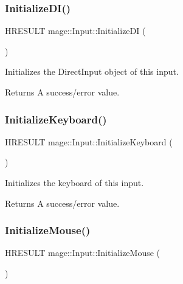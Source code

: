 \subsubsection{\texorpdfstring{Initialize\+D\+I()}{InitializeDI()}}
{\footnotesize\ttfamily H\+R\+E\+S\+U\+LT mage\+::\+Input\+::\+Initialize\+DI (\begin{DoxyParamCaption}{ }\end{DoxyParamCaption})\hspace{0.3cm}{\ttfamily [protected]}}

Initializes the Direct\+Input object of this input.

\begin{DoxyReturn}{Returns}
A success/error value. 
\end{DoxyReturn}
\hypertarget{classmage_1_1_input_ab7e61b7a81ce17aa2f959a18387922a6}{}\label{classmage_1_1_input_ab7e61b7a81ce17aa2f959a18387922a6} 
\subsubsection{\texorpdfstring{Initialize\+Keyboard()}{InitializeKeyboard()}}
{\footnotesize\ttfamily H\+R\+E\+S\+U\+LT mage\+::\+Input\+::\+Initialize\+Keyboard (\begin{DoxyParamCaption}{ }\end{DoxyParamCaption})\hspace{0.3cm}{\ttfamily [protected]}}

Initializes the keyboard of this input.

\begin{DoxyReturn}{Returns}
A success/error value. 
\end{DoxyReturn}
\hypertarget{classmage_1_1_input_a134b0a317bb6709b03995e04c2e3d3f1}{}\label{classmage_1_1_input_a134b0a317bb6709b03995e04c2e3d3f1} 
\subsubsection{\texorpdfstring{Initialize\+Mouse()}{InitializeMouse()}}
{\footnotesize\ttfamily H\+R\+E\+S\+U\+LT mage\+::\+Input\+::\+Initialize\+Mouse (\begin{DoxyParamCaption}{ }\end{DoxyParamCaption})\hspace{0.3cm}{\ttfamily [protected]}}

